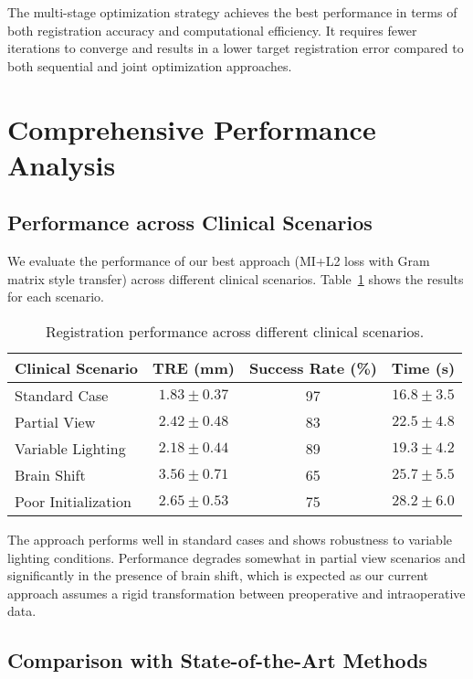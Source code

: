 The multi-stage optimization strategy achieves the best performance in terms of both registration accuracy and computational efficiency. It requires fewer iterations to converge and results in a lower target registration error compared to both sequential and joint optimization approaches.

\section{Comprehensive Performance Analysis}

\subsection{Performance across Clinical Scenarios}

We evaluate the performance of our best approach (MI+L2 loss with Gram matrix style transfer) across different clinical scenarios. Table~\ref{tab:clinical_scenarios} shows the results for each scenario.

\begin{table}[htpb]
  \caption[Registration performance across different clinical scenarios]{Registration performance across different clinical scenarios.}\label{tab:clinical_scenarios}
  \centering
  \begin{tabular}{l c c c}
    \toprule
      Clinical Scenario & TRE (mm) & Success Rate (\%) & Time (s) \\
    \midrule
      Standard Case & $1.83 \pm 0.37$ & 97 & $16.8 \pm 3.5$ \\
      Partial View & $2.42 \pm 0.48$ & 83 & $22.5 \pm 4.8$ \\
      Variable Lighting & $2.18 \pm 0.44$ & 89 & $19.3 \pm 4.2$ \\
      Brain Shift & $3.56 \pm 0.71$ & 65 & $25.7 \pm 5.5$ \\
      Poor Initialization & $2.65 \pm 0.53$ & 75 & $28.2 \pm 6.0$ \\
    \bottomrule
  \end{tabular}
\end{table}

The approach performs well in standard cases and shows robustness to variable lighting conditions. Performance degrades somewhat in partial view scenarios and significantly in the presence of brain shift, which is expected as our current approach assumes a rigid transformation between preoperative and intraoperative data.

\subsection{Comparison with State-of-the-Art Methods}

